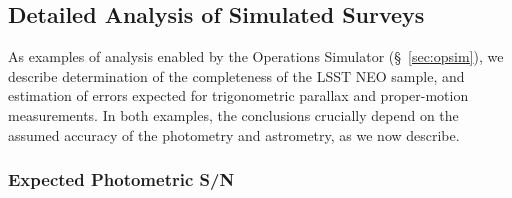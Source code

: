 \subsection{Detailed Analysis of Simulated Surveys}

As examples of analysis enabled by the Operations Simulator
(\S~\ref{sec:opsim}), we describe
determination of the completeness of the LSST NEO sample, and estimation
of errors expected for trigonometric parallax and proper-motion measurements.
In both examples, the conclusions crucially depend on the assumed
accuracy of the photometry and astrometry, as we now describe.

\subsubsection{Expected Photometric S/N}

